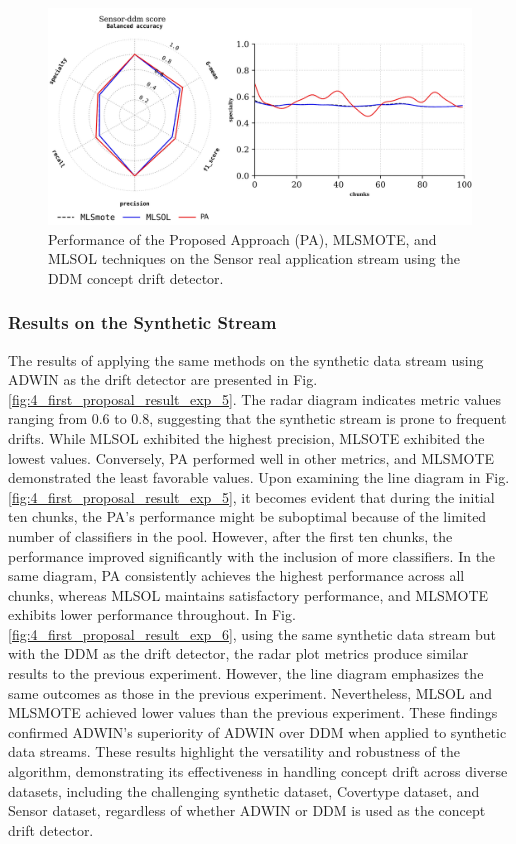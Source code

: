 \begin{figure}[!ht]
	\centering
	\includegraphics[width=1\linewidth]{4_Imbalanced/figures/exp_4.png}
  \caption{Performance of the Proposed Approach (PA), MLSMOTE, and MLSOL techniques on the Sensor real application stream using the DDM concept drift detector.}
	\label{fig:4_first_proposal_result_exp_4}
\end{figure}


\subsubsection{Results on the Synthetic Stream}
The results of applying the same methods on the synthetic data stream using ADWIN as the drift detector are presented in Fig. \ref{fig:4_first_proposal_result_exp_5}. The radar diagram indicates metric values ranging from 0.6 to 0.8, suggesting that the synthetic stream is prone to frequent drifts. While MLSOL exhibited the highest precision, MLSOTE exhibited the lowest values. Conversely, PA performed well in other metrics, and MLSMOTE demonstrated the least favorable values. Upon examining the line diagram in Fig. \ref{fig:4_first_proposal_result_exp_5}, it becomes evident that during the initial ten chunks, the PA's performance might be suboptimal because of the limited number of classifiers in the pool. However, after the first ten chunks, the performance improved significantly with the inclusion of more classifiers. In the same diagram, PA consistently achieves the highest performance across all chunks, whereas MLSOL maintains satisfactory performance, and MLSMOTE exhibits lower performance throughout. In Fig. \ref{fig:4_first_proposal_result_exp_6}, using the same synthetic data stream but with the DDM as the drift detector, the radar plot metrics produce similar results to the previous experiment. However, the line diagram emphasizes the same outcomes as those in the previous experiment. Nevertheless, MLSOL and MLSMOTE achieved lower values than the previous experiment. These findings confirmed ADWIN's superiority of ADWIN over DDM when applied to synthetic data streams. These results highlight the versatility and robustness of the algorithm, demonstrating its effectiveness in handling concept drift across diverse datasets, including the challenging synthetic dataset, Covertype dataset, and Sensor dataset, regardless of whether ADWIN or DDM is used as the concept drift detector.

